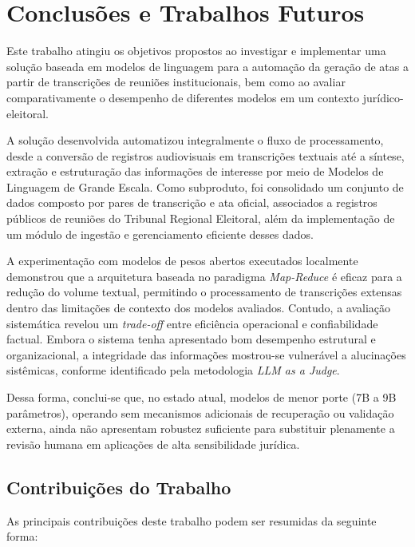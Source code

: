 \chapter{Conclusões e Trabalhos Futuros}
\label{chap:conclusoes-e-trabalhos-futuros}

Este trabalho atingiu os objetivos propostos ao investigar e implementar uma solução baseada em modelos de linguagem para a automação da geração de atas a partir de transcrições de reuniões institucionais, bem como ao avaliar comparativamente o desempenho de diferentes modelos em um contexto jurídico-eleitoral.

A solução desenvolvida automatizou integralmente o fluxo de processamento, desde a conversão de registros audiovisuais em transcrições textuais até a síntese, extração e estruturação das informações de interesse por meio de Modelos de Linguagem de Grande Escala. Como subproduto, foi consolidado um conjunto de dados composto por pares de transcrição e ata oficial, associados a registros públicos de reuniões do Tribunal Regional Eleitoral, além da implementação de um módulo de ingestão e gerenciamento eficiente desses dados.

A experimentação com modelos de pesos abertos executados localmente demonstrou que a arquitetura baseada no paradigma \textit{Map-Reduce} é eficaz para a redução do volume textual, permitindo o processamento de transcrições extensas dentro das limitações de contexto dos modelos avaliados. Contudo, a avaliação sistemática revelou um \textit{trade-off} entre eficiência operacional e confiabilidade factual. Embora o sistema tenha apresentado bom desempenho estrutural e organizacional, a integridade das informações mostrou-se vulnerável a alucinações sistêmicas, conforme identificado pela metodologia \textit{LLM as a Judge}.

Dessa forma, conclui-se que, no estado atual, modelos de menor porte (7B a 9B parâmetros), operando sem mecanismos adicionais de recuperação ou validação externa, ainda não apresentam robustez suficiente para substituir plenamente a revisão humana em aplicações de alta sensibilidade jurídica.

\section{Contribuições do Trabalho}
\label{sec:contribuicoes-do-trabalho}

As principais contribuições deste trabalho podem ser resumidas da seguinte forma:

